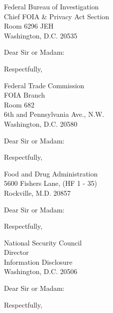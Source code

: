 \documentclass[10pt]{letter}
\begin{document}
\begin{letter}{Federal Bureau of Investigation \\
               Chief FOIA \& Privacy Act Section \\
               Room 6296 JEH \\
               Washington, D.C. 20535}               
\opening{Dear Sir or Madam:} \body \closing{Respectfully,}
\end{letter}

\begin{letter}{Federal Trade Commission \\
               FOIA Branch \\
               Room 682 \\
               6th and Pennsylvania Ave., N.W. \\
               Washington, D.C. 20580}               
\opening{Dear Sir or Madam:} \body \closing{Respectfully,}
\end{letter}

\begin{letter}{Food and Drug Administration \\
               5600 Fishers Lane, (HF 1 - 35) \\
               Rockville, M.D. 20857}               
\opening{Dear Sir or Madam:} \body \closing{Respectfully,}
\end{letter}

\begin{letter}{National Security Council \\
               Director \\
               Information Disclosure \\
               Washington, D.C. 20506}               
\opening{Dear Sir or Madam:} \body \closing{Respectfully,}
\end{letter}
\end{document}
